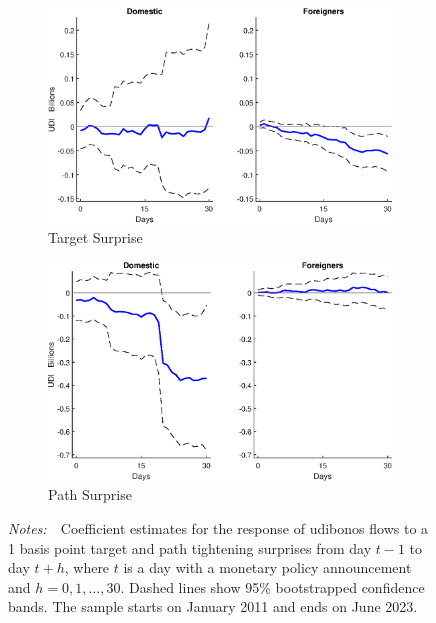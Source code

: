 \documentclass[a4paper, 12pt]{article}
\newcommand{\figtext}[1]{
	\vspace{-1ex}
	\captionsetup{justification=justified,font=footnotesize}
	\caption*{#1}
}
\newcommand{\fignotes}[1]{\figtext{\emph{Notes:~}~#1}}
\providecommand{\lastobsflwbdm}{June 2023}
\providecommand{\idxh}{h}
\begin{document}
\begin{appendices}
	\begin{figure}
		\caption{Udibonos Flow Response to Target and Path Surprises by Investor Residence} \label{fig:LPUdibonosCateg1}
		\begin{center}
			\begin{minipage}{\linewidth}
				\begin{center}
					\begin{subfigure}[b]{0.475\textwidth}
						\centering
						\includegraphics[width=\textwidth]{../Figures/Target11UdibonosCateg1.eps}
						\caption[]{{\small Target Surprise}} \label{subfig:Target11UdibonosCateg1}
					\end{subfigure}
					\hfill
					\begin{subfigure}[b]{0.475\textwidth}  
						\centering 
						\includegraphics[width=\textwidth]{../Figures/Path11UdibonosCateg1.eps}
						\caption[]{{\small Path Surprise}} \label{subfig:Path11UdibonosCateg1}
					\end{subfigure}
				\end{center}
				\fignotes{Coefficient estimates for the response of udibonos flows to a 1 basis point target and path tightening surprises from day \(t - 1\) to day \(t + \idxh\), where \(t\) is a day with a monetary policy announcement and \(\idxh = 0, 1, \ldots, 30\). Dashed lines show 95\% bootstrapped confidence bands. The sample starts on January 2011 and ends on \lastobsflwbdm.}
			\end{minipage} 
		\end{center}
	\end{figure}
	

\end{appendices}
\end{document}
